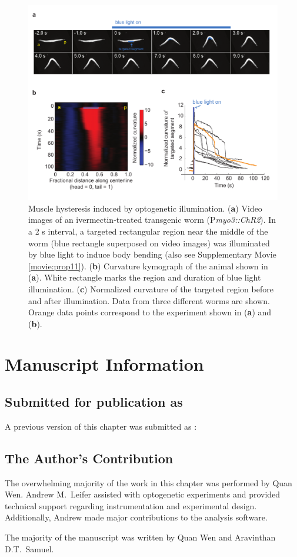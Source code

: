 \begin{figure} 
\includegraphics[width=\textwidth]{figures/prop_sup4}
\caption[Muscle hysteresis induced by optogenetic illumination. ] { Muscle hysteresis induced by optogenetic illumination. 
(\textbf{a}) Video images of an ivermectin-treated transgenic worm (P\textit{myo3::ChR2}). In a 2 s interval, 
a targeted rectangular region near the middle of the worm (blue rectangle superposed on video 
images) was illuminated by blue light to induce body bending (also see Supplementary Movie  \ref{movie:prop11}). 
(\textbf{b}) Curvature kymograph of the animal shown in (\textbf{a}). White rectangle marks the region and 
duration of blue light illumination. 
(\textbf{c}) Normalized curvature of the targeted region before and after illumination. Data from three 
different worms are shown. Orange data points correspond to the experiment shown in (\textbf{a}) and (\textbf{b}).
\label{fig:prop_sup4}}
\end{figure}




\section{Manuscript Information}
\subsection{Submitted for publication as}
A previous version of this chapter was submitted as \citep{wen_bending_2011}:


\subsection{The Author's Contribution}
The overwhelming majority of the work in this chapter was performed by Quan Wen. Andrew M.~Leifer assisted with optogenetic experiments and provided technical support regarding instrumentation and experimental design. Additionally, Andrew made major contributions to the analysis software. 

The majority of the manuscript was written by Quan Wen and Aravinthan D.T.~Samuel.
